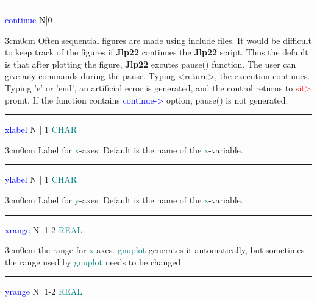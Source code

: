\vspace{0.3cm} 
\hrule 
\vspace{0.3cm} 
\noindent \textcolor{blue}{continue} \tabto{3cm} N|0  \tabto{5cm}    \tabto{7cm} 
\begin{changemargin}{3cm}{0cm} 
\noindent  Often sequential figures are made using include files. It would be difficult 
to keep track of the figures if \textbf{Jlp22} continues the \textbf{Jlp22} script. Thus the default is that 
after plotting the figure, \textbf{Jlp22} excutes \textcolor{VioletRed}{pause}() function. The user can 
give any commands during the pause. Typing <return>, the exceution continues. Typing 'e' or 'end', 
an artificial error is generated, and the control returns to \textcolor{Red}{sit>} promt. If the function 
contains \textcolor{blue}{continue->} option, \textcolor{VioletRed}{pause}() is not generated. 
\end{changemargin} 
\vspace{0.3cm} 
\hrule 
\vspace{0.3cm} 
\noindent \textcolor{blue}{xlabel}  \tabto{3cm}  N | 1 \tabto{5cm}  \textcolor{teal}{CHAR}  \tabto{7cm} 
\begin{changemargin}{3cm}{0cm} 
\noindent  Label for \textcolor{teal}{x}-axes. Default is the name of the \textcolor{teal}{x}-variable. 
\end{changemargin} 
\vspace{0.3cm} 
\hrule 
\vspace{0.3cm} 
\noindent \textcolor{blue}{ylabel}  \tabto{3cm}  N | 1 \tabto{5cm}  \textcolor{teal}{CHAR}  \tabto{7cm} 
\begin{changemargin}{3cm}{0cm} 
\noindent  Label for \textcolor{teal}{y}-axes. Default is the name of the \textcolor{teal}{x}-variable. 
\end{changemargin} 
\vspace{0.3cm} 
\hrule 
\vspace{0.3cm} 
\noindent \textcolor{blue}{xrange}  \tabto{3cm}  N |1-2 \tabto{5cm}   \textcolor{teal}{REAL} \tabto{7cm} 
\begin{changemargin}{3cm}{0cm} 
\noindent the range for \textcolor{teal}{x}-axes. \textcolor{teal}{gnuplot} generates it automatically, but 
sometimes the range used by \textcolor{teal}{gnuplot} needs to be changed. 
\end{changemargin} 
\vspace{0.3cm} 
\hrule 
\vspace{0.3cm} 
\noindent \textcolor{blue}{yrange}  \tabto{3cm}  N |1-2 \tabto{5cm}  \textcolor{teal}{REAL} \tabto{7cm} 
